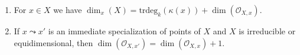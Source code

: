 \begin{lemma}
\begin{enumerate}
\begin{enumerate}
\item $\text{trdeg}_k(\kappa(x)) > \text{trdeg}_k(\kappa(x'))$, and
\item any maximal chain of nontrivial specializations
$x = x_0 \leadsto x_1 \leadsto \ldots \leadsto x_n = x'$ has
length $n = \text{trdeg}_k(\kappa(x)) - \text{trdeg}_k(\kappa(x'))$.
\end{enumerate}
\item
\label{varieties-item-dimension-formula}
For $x \in X$ we have
$\dim_x(X) = \text{trdeg}_k(\kappa(x)) + \dim(\mathcal{O}_{X, x})$.
\item
\label{varieties-item-immediate-specialization-local-ring}
If $x \leadsto x'$ is an immediate specialization
of points of $X$ and $X$ is irreducible or equidimensional, then
$\dim(\mathcal{O}_{X, x'}) = \dim(\mathcal{O}_{X, x}) + 1$.
\end{enumerate}
\end{lemma}


